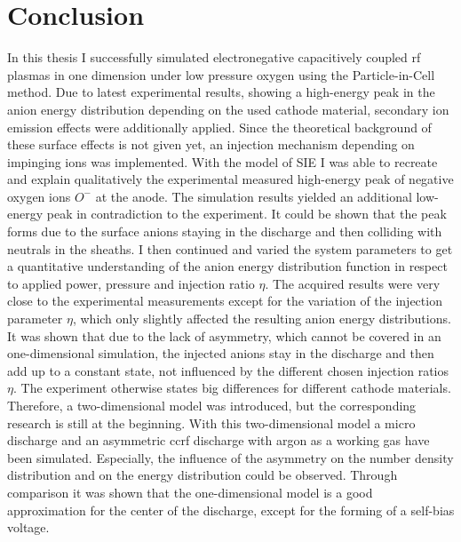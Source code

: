 \chapter{Conclusion}

In this thesis I successfully simulated electronegative capacitively coupled rf plasmas in one dimension under low pressure oxygen using the Particle-in-Cell method. 
Due to latest experimental results, showing a high-energy peak in the anion energy distribution depending on the used cathode material, secondary ion emission effects were additionally applied.
Since the theoretical background of these surface effects is not given yet, an injection mechanism depending on impinging ions was implemented.
With the model of SIE I was able to recreate and explain qualitatively the experimental measured high-energy peak of negative oxygen ions $O^-$ at the anode.
The simulation results yielded an additional low-energy peak in contradiction to the experiment.
It could be shown that the peak forms due to the surface anions staying in the discharge and then colliding with neutrals in the sheaths.
I then continued and varied the system parameters to get a quantitative understanding of the anion energy distribution function in respect to applied power, pressure and injection ratio $\eta$.
The acquired results were very close to the experimental measurements except for the variation of the injection parameter $\eta$, which only slightly affected the resulting anion energy distributions.
It was shown that due to the lack of asymmetry, which cannot be covered in an one-dimensional simulation, the injected anions stay in the discharge and then add up to a constant state, not influenced by the different chosen injection ratios $\eta$.
The experiment otherwise states big differences for different cathode materials.\\
Therefore, a two-dimensional model was introduced, but the corresponding research is still at the beginning.
With this two-dimensional model a micro discharge and an asymmetric ccrf discharge with argon as a working gas have been simulated.
Especially, the influence of the asymmetry on the number density distribution and on the energy distribution could be observed.
Through comparison it was shown that the one-dimensional model is a good approximation for the center of the discharge, except for the forming of a self-bias voltage.
